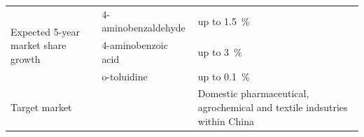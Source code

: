 \begin{landscape}
\begin{table}[h]
\begin{tabular}{@{}lll@{}}
\multirow{3}{*}{Expected 5-year market share growth} & 4-aminobenzaldehyde & up to \SI{1.5}{\percent}                                                                                                                                                                                                                                                                                                                                                                                                           \\ \cmidrule(l){2-3} 
                                                     & 4-aminobenzoic acid & up to \SI{3}{\percent}                                                                                                                                                                                                                                                                                                                                                                                                             \\ \cmidrule(l){2-3} 
                                                     & o-toluidine         & up to \SI{0.1}{\percent}                                                                                                                                                                                                                                                                                                                                                                                                           \\ \midrule
\multicolumn{2}{l}{Target market}                                        & Domestic pharmaceutical, agrochemical and textile indsutries within China                                                                                                                                                                                                                                                                                                                                             \\ \bottomrule
\end{tabular}
\end{table}

\end{landscape}

